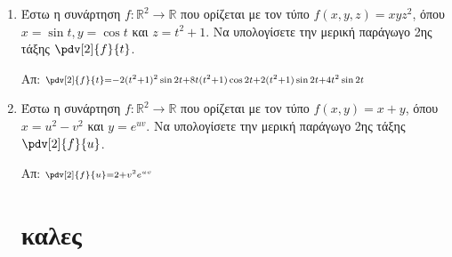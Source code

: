 \begin{enumerate}
  \item Έστω η συνάρτηση $ f : \mathbb{R}^{2} \to \mathbb{R} $ που ορίζεται με τον τύπο $ f(x,y,z) =
    xyz^{2}$, όπου $ x = \sin{t}, y = \cos{t} $ και $ z = t^{2}+1 $. Να υπολογίσετε την μερική
    παράγωγο 2ης τάξης $ \pdv[2]{f}{t} $.

    \hfill Απ: $\scriptstyle{\pdv[2]{f}{t} = -2(t^{2}+1)^{2} \sin{2t} + 8t(t^{2}+1) \cos{2t} +
    2(t^{2}+1) \sin{2t} + 4t^{2} \sin{2t}}$

  \item Έστω η συνάρτηση $ f : \mathbb{R}^{2} \to \mathbb{R} $ που ορίζεται με τον τύπο $ f(x,y) =
    x+y$, όπου $ x = u^{2} - v^{2} $ και $ y = e^{uv} $. Να υπολογίσετε την μερική παράγωγο 2ης
    τάξης $ \pdv[2]{f}{u} $.

    \hfill Απ: $ \scriptstyle{\pdv[2]{f}{u} = 2 + v^{2}e^{uv}} $



    \section{καλες}













\end{enumerate}
